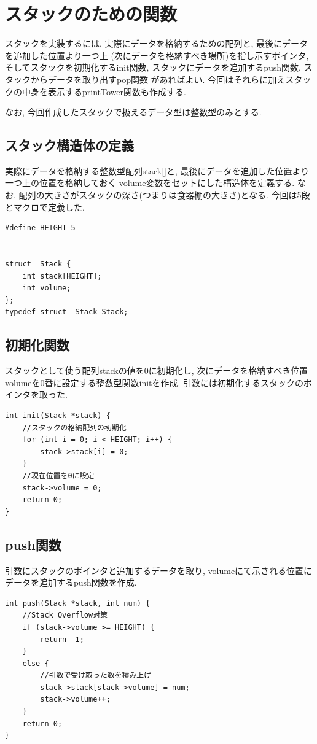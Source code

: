 \documentclass[a4j]{jsarticle}
\begin{document}
\section{スタックのための関数}
    スタックを実装するには, 実際にデータを格納するための配列と, 最後にデータを追加した位置より一つ上
    (次にデータを格納すべき場所)を指し示すポインタ, 
    そしてスタックを初期化するinit関数, スタックにデータを追加するpush関数, スタックからデータを取り出すpop関数
    があればよい. 今回はそれらに加えスタックの中身を表示するprintTower関数も作成する. 

    なお, 今回作成したスタックで扱えるデータ型は整数型のみとする. 

    \subsection{スタック構造体の定義}
    実際にデータを格納する整数型配列stack[]と, 最後にデータを追加した位置より一つ上の位置を格納しておく
    volume変数をセットにした構造体を定義する. 
    なお, 配列の大きさがスタックの深さ(つまりは食器棚の大きさ)となる. 今回は5段とマクロで定義した. 
    \begin{lstlisting}[label = s-1, caption = スタック構造体の定義]
#define HEIGHT 5


struct _Stack {
	int stack[HEIGHT];
	int volume;
};
typedef struct _Stack Stack;
    \end{lstlisting}

    \subsection{初期化関数}
    スタックとして使う配列stackの値を0に初期化し, 次にデータを格納すべき位置volumeを0番に設定する整数型関数initを作成. 
    引数には初期化するスタックのポインタを取った. 
    \begin{lstlisting}[label = init, caption = 初期化関数init]
int init(Stack *stack) {
	//スタックの格納配列の初期化
	for (int i = 0; i < HEIGHT; i++) {
		stack->stack[i] = 0;
	}
	//現在位置を0に設定
	stack->volume = 0;
	return 0;
}
    \end{lstlisting}

    \subsection{push関数}
    引数にスタックのポインタと追加するデータを取り, volumeにて示される位置にデータを追加するpush関数を作成. 
    \begin{lstlisting}[label = push, caption = push関数]
int push(Stack *stack, int num) {
	//Stack Overflow対策
	if (stack->volume >= HEIGHT) {
		return -1;
	}
	else {
		//引数で受け取った数を積み上げ
		stack->stack[stack->volume] = num;
		stack->volume++;
	}
	return 0;
}
    \end{lstlisting}
\end{document}
